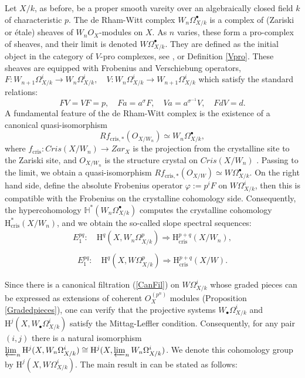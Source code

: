 \documentclass[a4paper,12pt,twoside]{report}
\newcommand{\Hc}{\mathbb{H}}
\newcommand{\cris}{\mathrm{cris}}
\newcommand{\HH}{\mathrm{H}}
\begin{document}
Let $X/k$, as before, be a proper smooth vareity over an algebraically closed field $k$ of characteristic $p$. 
The de Rham-Witt complex $W_n\Omega_{X/k}^\bullet$ is
a complex of (Zariski or \'etale) sheaves of $W_nO_X$-modules on $X$. 
As $n$ varies, these form a pro-complex of sheaves, 
and their limit is denoted $W\Omega_{X/k}^\bullet$. 
They are defined as the initial object in the category of $V$-pro complexes, see \cite[Definition I.1.4]{Il1}, or Definition \ref{Vpro}. 
These sheaves are equipped with Frobenius and Verschiebung operators,
$F: W_{n+1}\Omega^i_{X/k}\rightarrow W_n\Omega^i_{X/k},\quad V: W_n\Omega^i_{X/k}\rightarrow W_{n+1}\Omega^i_{X/k}$ 
which satisfy the standard relations: 
\[FV=VF=p, \quad Fa=a^{\sigma}F, \quad Va=a^{\sigma^{-1}}V, \quad FdV=d.\]
A fundamental feature of the de Rham-Witt complex is the existence of a canonical quasi-isomorphism
\[Rf_{\cris,*}(O_{X/W_n}) \simeq W_n\Omega_{X/k}^\bullet,\]
where  $f_{\cris}:Cris(X/W_n) \rightarrow Zar_{X}$ is the projection from the crystalline site to the 
Zariski site, and $O_{X/W_n}$ is the structure crystal on $Cris(X/W_n)$ \cite[Theorem II.1.4]{Il1}. 
Passing to the limit, we obtain a quasi-isomorphism $Rf_{\cris,*}(O_{X/W}) \simeq W\Omega_{X/k}^\bullet$. 
On the right hand side, define the absolute Frobenius operator $\varphi:=p^iF$ on $W\Omega^i_{X/k}$, 
then this is compatible with the Frobenius on the crystalline cohomology side. 
Consequently, the hypercohomology $\Hc^*(W_n\Omega_{X/k}^\bullet)$ 
computes the crystalline cohomology $\HH^*_{\cris}(X/W_n)$, 
and we obtain the so-called slope spectral sequences:  
\begin{equation}
    \label{SSf} \begin{aligned}
        E_1^{pq}: \quad\HH^q(X,W_n\Omega^p_{X/k})\Longrightarrow \HH^{p+q}_{\cris}(X/W_n),\\
    \end{aligned}
\end{equation}
\begin{equation}
    \label{SS} \begin{aligned}
        E_1^{pq}:\quad\HH^q(X,W\Omega^p_{X/k})\Longrightarrow \HH^{p+q}_{\cris}(X/W).
    \end{aligned}
\end{equation}

Since there is a canonical filtration (\ref{CanFil}) on $W\Omega_{X/k}^i$ 
whose graded pieces can be expressed as extensions of coherent $O_X^{(p^n)}$ modules (Proposition \ref{Gradedpieces}), 
one can verify that the projective systems $W_\bullet\Omega^i_{X/k}$ and $\HH^j(X,W_\bullet\Omega^i_{X/k})$ 
satisfy the Mittag-Leffler condition. 
Consequently, for any pair $(i,j)$ there is a natural isomorphism 
$\varprojlim_n \HH^j(X,W_n\Omega^i_{X/k})\cong \HH^j(X,\varprojlim_{n}W_n\Omega^i_{X/k})$. 
We denote this cohomology group by $\HH^j(X,W\Omega^i_{X/k})$. 
The main result in \cite{Il1} can be stated as follows: 
\end{document}
